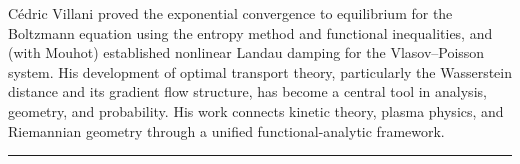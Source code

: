 Cédric Villani proved the exponential convergence to equilibrium for the Boltzmann equation using the entropy method and functional inequalities, and (with Mouhot) established nonlinear Landau damping for the Vlasov--Poisson system. His development of optimal transport theory, particularly the Wasserstein distance and its gradient flow structure, has become a central tool in analysis, geometry, and probability. His work connects kinetic theory, plasma physics, and Riemannian geometry through a unified functional-analytic framework.

\begin{center}\rule{0.5\linewidth}{0.5pt}\end{center}
